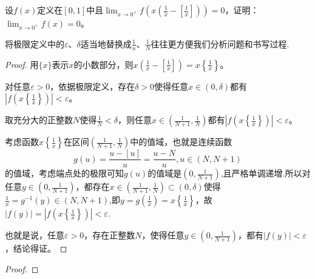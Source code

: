 \documentclass[../../main.tex]{subfiles}
\begin{document}
\begin{example}
设\(f(x)\)定义在\([0,1]\)中且\(\lim_{x\rightarrow0^{+}}f\left(x\left(\frac{1}{x}-\left[\frac{1}{x}\right]\right)\right)=0\)，证明：\(\lim_{x\rightarrow0^{+}}f(x)=0\)。
\end{example}
\begin{note}
将极限定义中的$\varepsilon、\delta$适当地替换成$\frac{1}{n}、\frac{1}{N}$往往更方便我们分析问题和书写过程.
\end{note}
\begin{proof}
用\(\{x\}\)表示\(x\)的小数部分，则\(x\left(\frac{1}{x}-\left[\frac{1}{x}\right]\right)=x\left\{\frac{1}{x}\right\}\)。

对任意\(\varepsilon>0\)，依据极限定义，存在\(\delta>0\)使得任意\(x\in(0,\delta)\)都有\(\left|f\left(x\left\{\frac{1}{x}\right\}\right)\right|<\varepsilon\)。

取充分大的正整数\(N\)使得\(\frac{1}{N}<\delta\)，则任意\(x\in\left(\frac{1}{N + 1},\frac{1}{N}\right)\)都有\(\left|f\left(x\left\{\frac{1}{x}\right\}\right)\right|<\varepsilon\)。

考虑函数\(x\left\{\frac{1}{x}\right\}\)在区间\(\left(\frac{1}{N + 1},\frac{1}{N}\right)\)中的值域，也就是连续函数
\[g(u)=\frac{u - [u]}{u}=\frac{u - N}{u},u\in(N,N + 1)\]
的值域，考虑端点处的极限可知\(g(u)\)的值域是\(\left(0,\frac{1}{N + 1}\right)\),且严格单调递增.所以对任意\(y\in\left(0,\frac{1}{N + 1}\right)\)，都存在\(x\in\left(\frac{1}{N + 1},\frac{1}{N}\right)\subset(0,\delta)\)使得$\frac{1}{x}=g^{-1}(y)\in(N,N+1)$,即\(y =g(\frac{1}{x})= x\left\{\frac{1}{x}\right\}\)，故\(|f(y)|=\left|f\left(x\left\{\frac{1}{x}\right\}\right)\right|<\varepsilon\).

也就是说，任意\(\varepsilon>0\)，存在正整数\(N\)，使得任意\(y\in\left(0,\frac{1}{N + 1}\right)\)，都有\(|f(y)|<\varepsilon\)，结论得证。
\end{proof}

\begin{example}

\end{example}
\begin{proof}

\end{proof}
\end{document}
